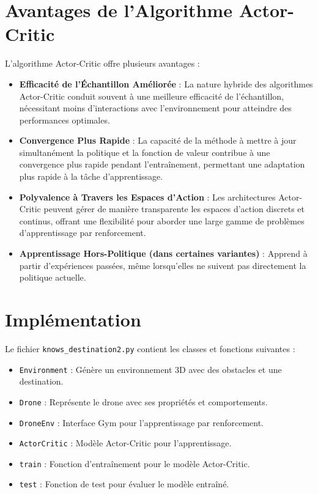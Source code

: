 \documentclass[a4paper, 12pt]{article}
\begin{document}
\section{Avantages de l'Algorithme Actor-Critic}
L'algorithme Actor-Critic offre plusieurs avantages :
\begin{itemize}
    \item \textbf{Efficacité de l'Échantillon Améliorée} : La nature hybride des algorithmes Actor-Critic conduit souvent à une meilleure efficacité de l'échantillon, nécessitant moins d'interactions avec l'environnement pour atteindre des performances optimales.
    \item \textbf{Convergence Plus Rapide} : La capacité de la méthode à mettre à jour simultanément la politique et la fonction de valeur contribue à une convergence plus rapide pendant l'entraînement, permettant une adaptation plus rapide à la tâche d'apprentissage.
    \item \textbf{Polyvalence à Travers les Espaces d'Action} : Les architectures Actor-Critic peuvent gérer de manière transparente les espaces d'action discrets et continus, offrant une flexibilité pour aborder une large gamme de problèmes d'apprentissage par renforcement.
    \item \textbf{Apprentissage Hors-Politique (dans certaines variantes)} : Apprend à partir d'expériences passées, même lorsqu'elles ne suivent pas directement la politique actuelle.
\end{itemize}

\section{Implémentation}
Le fichier \texttt{knows\_destination2.py} contient les classes et fonctions suivantes :
\begin{itemize}
    \item \texttt{Environment} : Génère un environnement 3D avec des obstacles et une destination.
    \item \texttt{Drone} : Représente le drone avec ses propriétés et comportements.
    \item \texttt{DroneEnv} : Interface Gym pour l'apprentissage par renforcement.
    \item \texttt{ActorCritic} : Modèle Actor-Critic pour l'apprentissage.
    \item \texttt{train} : Fonction d'entraînement pour le modèle Actor-Critic.
    \item \texttt{test} : Fonction de test pour évaluer le modèle entraîné.
\end{itemize}
\end{document}
